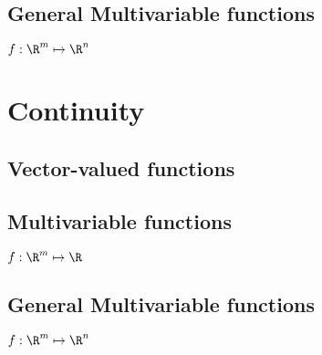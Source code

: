 \subsection{General Multivariable functions}

$f : \R^m\mapsto \R^n$

\section{Continuity}

\subsection{Vector-valued functions}

\subsection{Multivariable functions}

$f : \R^m\mapsto \R$

\subsection{General Multivariable functions}

$f : \R^m\mapsto \R^n$